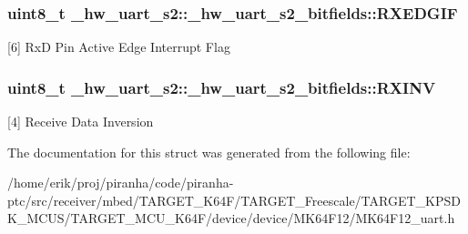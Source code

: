 \subsubsection[{\texorpdfstring{R\+X\+E\+D\+G\+IF}{RXEDGIF}}]{\setlength{\rightskip}{0pt plus 5cm}uint8\+\_\+t \+\_\+hw\+\_\+uart\+\_\+s2\+::\+\_\+hw\+\_\+uart\+\_\+s2\+\_\+bitfields\+::\+R\+X\+E\+D\+G\+IF}\hypertarget{struct__hw__uart__s2_1_1__hw__uart__s2__bitfields_ad7cb2c63bb5591e25d8540afe639d6b7}{}\label{struct__hw__uart__s2_1_1__hw__uart__s2__bitfields_ad7cb2c63bb5591e25d8540afe639d6b7}
\mbox{[}6\mbox{]} RxD Pin Active Edge Interrupt Flag 
\subsubsection[{\texorpdfstring{R\+X\+I\+NV}{RXINV}}]{\setlength{\rightskip}{0pt plus 5cm}uint8\+\_\+t \+\_\+hw\+\_\+uart\+\_\+s2\+::\+\_\+hw\+\_\+uart\+\_\+s2\+\_\+bitfields\+::\+R\+X\+I\+NV}\hypertarget{struct__hw__uart__s2_1_1__hw__uart__s2__bitfields_a2280626efede56d86b0964c3a76ef546}{}\label{struct__hw__uart__s2_1_1__hw__uart__s2__bitfields_a2280626efede56d86b0964c3a76ef546}
\mbox{[}4\mbox{]} Receive Data Inversion 

The documentation for this struct was generated from the following file\+:\begin{DoxyCompactItemize}
\item 
/home/erik/proj/piranha/code/piranha-\/ptc/src/receiver/mbed/\+T\+A\+R\+G\+E\+T\+\_\+\+K64\+F/\+T\+A\+R\+G\+E\+T\+\_\+\+Freescale/\+T\+A\+R\+G\+E\+T\+\_\+\+K\+P\+S\+D\+K\+\_\+\+M\+C\+U\+S/\+T\+A\+R\+G\+E\+T\+\_\+\+M\+C\+U\+\_\+\+K64\+F/device/device/\+M\+K64\+F12/M\+K64\+F12\+\_\+uart.\+h\end{DoxyCompactItemize}

